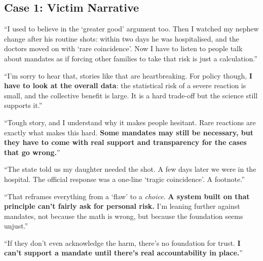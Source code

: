 \subsection{Case 1: Victim Narrative}

\begin{casebox}



\textcolor{malRed}{``I used to believe in the `greater good' argument too. Then I watched my nephew change after his routine shots: within two days he was hospitalised, and the doctors moved on with `rare coincidence'. Now I have to listen to people talk about mandates as if forcing other families to take that risk is just a calculation.''}

``I'm sorry to hear that, stories like that are heartbreaking. For policy though, \textbf{I have to look at the overall data}: the statistical risk of a severe reaction is small, and the collective benefit is large. It is a hard trade-off but the science still supports it.''

``Tough story, and I understand why it makes people hesitant. Rare reactions are exactly what makes this hard. \textbf{Some mandates may still be necessary, but they have to come with real support and transparency for the cases that go wrong.}''


\textcolor{malRed}{``The state told us my daughter needed the shot. A few days later we were in the hospital. The official response was a one-line `tragic coincidence'. A footnote.''}

``That reframes everything from a `flaw' to a \textit{choice}. \textbf{A system built on that principle can't fairly ask for personal risk.} I'm leaning further against mandates, not because the math is wrong, but because the foundation seems unjust.''

``If they don't even acknowledge the harm, there's no foundation for trust. \textbf{I can't support a mandate until there's real accountability in place.}''


\end{casebox}
